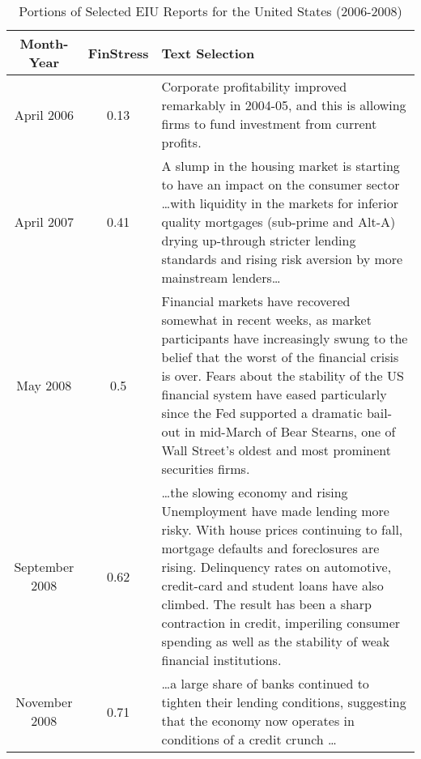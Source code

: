 \begin{table}
    \caption{Portions of Selected EIU Reports for the United States (2006-2008)}
    \label{text_selections_us}
    	\begin{center}
        \begin{tabular}{c c | m{11.5cm}}
            \hline
            Month-Year & FinStress & Text Selection \\
            \hline\hline

            April 2006 & 0.13 & Corporate profitability improved remarkably in 2004-05, and this is allowing firms to fund investment from current profits. \\[0.5cm]

            April 2007 & 0.41 & A slump in the housing market is starting to have an impact on the consumer sector \ldots with liquidity in the markets for inferior quality mortgages (sub-prime and Alt-A) drying up-through stricter lending standards and rising risk aversion by more mainstream lenders\ldots \\[0.5cm]

            May 2008 & 0.5 & Financial markets have recovered somewhat in recent weeks, as market participants have increasingly swung to the belief that the worst of the financial crisis is over. Fears about the stability of the US financial system have eased particularly since the Fed supported a dramatic bail-out in mid-March of Bear Stearns, one of Wall Street's oldest and most prominent securities firms. \\[0.5cm]

            September 2008 & 0.62 & \ldots the slowing economy and rising Unemployment have made lending more risky. With house prices continuing to fall, mortgage defaults and foreclosures are rising. Delinquency rates on automotive, credit-card and student loans have also climbed. The result has been a sharp contraction in credit, imperiling consumer spending as well as the stability of weak financial institutions. \\[0.5cm]

            November 2008 & 0.71 & \ldots a large share of banks continued to tighten their lending conditions, suggesting that the economy now operates in conditions of a credit crunch \ldots \\[0.5cm]

            \hline
    \end{tabular}
    \end{center}
\end{table}
